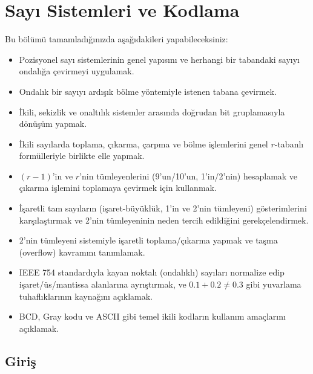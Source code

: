 \chapter{Sayı Sistemleri ve Kodlama}
\label{chap:sayi-sistemleri}

\begin{tcolorbox}[
    colback=blokyesil!15,
    colframe=sinyalyesil!60!black,
    title={\textbf{Öğrenme Hedefleri}},
    fonttitle=\bfseries,
    rounded corners,
    boxrule=0.8pt
]
Bu bölümü tamamladığınızda aşağıdakileri yapabileceksiniz:
\begin{itemize}[nosep, leftmargin=*]
    \item Pozisyonel sayı sistemlerinin genel yapısını ve herhangi bir tabandaki sayıyı
    ondalığa çevirmeyi uygulamak.
    \item Ondalık bir sayıyı ardışık bölme yöntemiyle istenen tabana çevirmek.
    \item İkili, sekizlik ve onaltılık sistemler arasında doğrudan bit gruplamasıyla dönüşüm
    yapmak.
    \item İkili sayılarda toplama, çıkarma, çarpma ve bölme işlemlerini genel $r$-tabanlı
    formülleriyle birlikte elle yapmak.
    \item $(r{-}1)$'in ve $r$'nin tümleyenlerini (9'un/10'un, 1'in/2'nin) hesaplamak ve
    çıkarma işlemini toplamaya çevirmek için kullanmak.
    \item İşaretli tam sayıların (işaret-büyüklük, 1'in ve 2'nin tümleyeni) gösterimlerini
    karşılaştırmak ve 2'nin tümleyeninin neden tercih edildiğini gerekçelendirmek.
    \item 2'nin tümleyeni sistemiyle işaretli toplama/çıkarma yapmak ve taşma (overflow)
    kavramını tanımlamak.
    \item IEEE 754 standardıyla kayan noktalı (ondalıklı) sayıları normalize edip
    işaret/üs/mantissa alanlarına ayrıştırmak, ve $0.1+0.2\neq0.3$ gibi yuvarlama
    tuhaflıklarının kaynağını açıklamak.
    \item BCD, Gray kodu ve ASCII gibi temel ikili kodların kullanım amaçlarını açıklamak.
\end{itemize}
\end{tcolorbox}

\section{Giriş}
\label{sec:sayi-sistemleri-giris}

